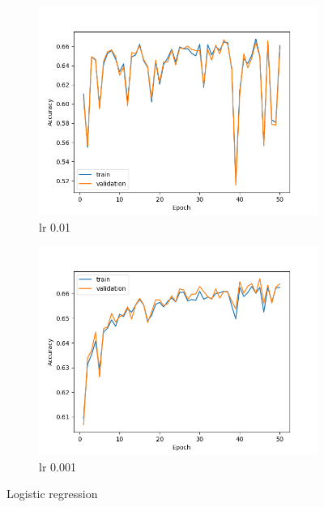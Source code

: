 \documentclass[11pt]{article}
\begin{document}
\begin{figure}[h!]
\centering
\begin{subfigure}{.5\textwidth}
  \centering
  \includegraphics[width=\linewidth]{./plots/logistic_regression_0.01.png}
  \caption{lr 0.01}
  \label{fig:sub1}
\end{subfigure}%
\begin{subfigure}{.5\textwidth}
  \centering
  \includegraphics[width=\linewidth]{./plots/logistic_regression_0.001.png}
  \caption{lr 0.001}
  \label{fig:sub2}
\end{subfigure}
\caption{Logistic regression}
\label{fig:logistic_regression}
\end{figure}
\end{document}
